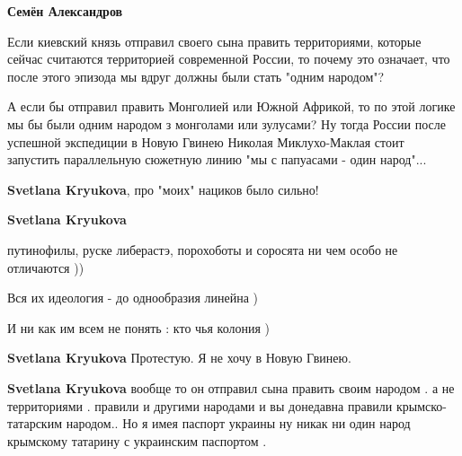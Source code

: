 \begin{itemize}
\begin{itemize}
\textbf{Семён Александров} 

Если киевский князь отправил своего сына править территориями, которые сейчас
считаются территорией современной России, то почему это означает, что после
этого эпизода мы вдруг должны были стать "одним народом"? 

А если бы отправил править Монголией или Южной Африкой, то по этой логике мы бы
были одним народом з монголами или зулусами? Ну тогда России после успешной
экспедиции в Новую Гвинею Николая Миклухо-Маклая стоит запустить параллельную
сюжетную линию "мы с папуасами - один народ"...


 
\textbf{Svetlana Kryukova}, про "моих" нациков было сильно!

 
\textbf{Svetlana Kryukova} 

путинофилы, руске либерастэ, порохоботы и соросята ни чем особо не отличаются ))

Вся их идеология - до однообразия линейна )

И ни как им всем не понять : кто чья колония )

 
\textbf{Svetlana Kryukova} Протестую. Я не хочу в Новую Гвинею.

 
\textbf{Svetlana Kryukova} вообще то он отправил сына править своим народом . а не территориями . правили и другими народами и вы донедавна правили крымско-татарским народом.. Но я имея паспорт украины ну никак ни один народ крымскому татарину с украинским паспортом .


\end{itemize}
\end{itemize}
